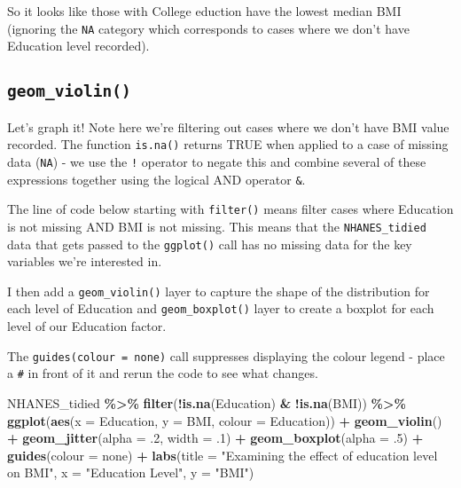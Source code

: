 \documentclass[
]{book}
\newenvironment{Shaded}{\begin{snugshade}}{\end{snugshade}}
\newcommand{\AttributeTok}[1]{\textcolor[rgb]{0.13,0.29,0.53}{#1}}
\newcommand{\DecValTok}[1]{\textcolor[rgb]{0.00,0.00,0.81}{#1}}
\newcommand{\FunctionTok}[1]{\textcolor[rgb]{0.13,0.29,0.53}{\textbf{#1}}}
\newcommand{\NormalTok}[1]{#1}
\newcommand{\SpecialCharTok}[1]{\textcolor[rgb]{0.81,0.36,0.00}{\textbf{#1}}}
\newcommand{\StringTok}[1]{\textcolor[rgb]{0.31,0.60,0.02}{#1}}
\begin{document}
So it looks like those with College eduction have the lowest median BMI (ignoring the \texttt{NA} category which corresponds to cases where we don't have Education level recorded).

\hypertarget{geom_violin}{%
\subsection{\texorpdfstring{\texttt{geom\_violin()}}{geom\_violin()}}\label{geom_violin}}

Let's graph it! Note here we're filtering out cases where we don't have BMI value recorded. The function \texttt{is.na()} returns TRUE when applied to a case of missing data (\texttt{NA}) - we use the \texttt{!} operator to negate this and combine several of these expressions together using the logical AND operator \texttt{\&}.

The line of code below starting with \texttt{filter()} means filter cases where Education is not missing AND BMI is not missing. This means that the \texttt{NHANES\_tidied} data that gets passed to the \texttt{ggplot()} call has no missing data for the key variables we're interested in.

I then add a \texttt{geom\_violin()} layer to capture the shape of the distribution for each level of Education and \texttt{geom\_boxplot()} layer to create a boxplot for each level of our Education factor.

The \texttt{guides(colour\ =\ \textquotesingle{}none\textquotesingle{})} call suppresses displaying the colour legend - place a \texttt{\#} in front of it and rerun the code to see what changes.

\begin{Shaded}
\begin{Highlighting}[]
\NormalTok{NHANES\_tidied }\SpecialCharTok{\%\textgreater{}\%} 
  \FunctionTok{filter}\NormalTok{(}\SpecialCharTok{!}\FunctionTok{is.na}\NormalTok{(Education) }\SpecialCharTok{\&} \SpecialCharTok{!}\FunctionTok{is.na}\NormalTok{(BMI)) }\SpecialCharTok{\%\textgreater{}\%}
  \FunctionTok{ggplot}\NormalTok{(}\FunctionTok{aes}\NormalTok{(}\AttributeTok{x =}\NormalTok{ Education, }\AttributeTok{y =}\NormalTok{ BMI, }\AttributeTok{colour =}\NormalTok{ Education)) }\SpecialCharTok{+} 
  \FunctionTok{geom\_violin}\NormalTok{() }\SpecialCharTok{+}
  \FunctionTok{geom\_jitter}\NormalTok{(}\AttributeTok{alpha =}\NormalTok{ .}\DecValTok{2}\NormalTok{, }\AttributeTok{width =}\NormalTok{ .}\DecValTok{1}\NormalTok{) }\SpecialCharTok{+}
  \FunctionTok{geom\_boxplot}\NormalTok{(}\AttributeTok{alpha =}\NormalTok{ .}\DecValTok{5}\NormalTok{) }\SpecialCharTok{+}
  \FunctionTok{guides}\NormalTok{(}\AttributeTok{colour =} \StringTok{\textquotesingle{}none\textquotesingle{}}\NormalTok{) }\SpecialCharTok{+} 
  \FunctionTok{labs}\NormalTok{(}\AttributeTok{title =} \StringTok{"Examining the effect of education level on BMI"}\NormalTok{, }
       \AttributeTok{x =} \StringTok{"Education Level"}\NormalTok{, }
       \AttributeTok{y =} \StringTok{"BMI"}\NormalTok{)}
\end{Highlighting}
\end{Shaded}
\end{document}
